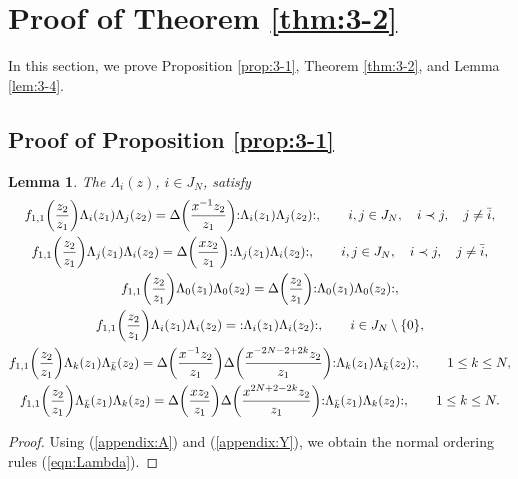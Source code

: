\documentclass[10pt,a4paper]{amsart}
\numberwithin{equation}{section}
\newtheorem{Lemma}[Theorem]{Lemma}
\begin{document}
\section{Proof of Theorem \ref{thm:3-2}}
\label{section:4}

In this section, we prove
Proposition \ref{prop:3-1},
Theorem \ref{thm:3-2},
and Lemma \ref{lem:3-4}.

\subsection{Proof of Proposition \ref{prop:3-1}}

\begin{Lemma}
The $\Lambda_i(z)$, $i \in J_N$, satisfy
\begin{gather}
f_{1,1}\biggl(\frac{z_2}{z_1}\biggr)\Lambda_i(z_1)\Lambda_j(z_2)=
\Delta\biggl(\frac{x^{-1}z_2}{z_1}\biggr)
{:}\Lambda_i(z_1)\Lambda_j(z_2){:},\qquad
i,j \in J_N,\quad i \prec j,\quad j \neq \bar{i},\notag
\\
f_{1,1}\biggl(\frac{z_2}{z_1}\biggr)\Lambda_j(z_1)\Lambda_i(z_2)=
\Delta\biggl(\frac{x z_2}{z_1}\biggr){:}\Lambda_j(z_1)\Lambda_i(z_2){:},\qquad
{i,j \in J_N,\quad i \prec j,\quad j \neq \bar{i}},\notag
\\
f_{1,1}\biggl(\frac{z_2}{z_1}\biggr)\Lambda_0(z_1)\Lambda_0(z_2)=
\Delta\biggl(\frac{z_2}{z_1}\biggr){:}\Lambda_0(z_1)\Lambda_0(z_2){:},\notag
\\
f_{1,1}\biggl(\frac{z_2}{z_1}\biggr)\Lambda_i(z_1)\Lambda_i(z_2)=
{:}\Lambda_i(z_1)\Lambda_i(z_2){:},\qquad
i \in J_N\setminus \{0\},
\label{eqn:Lambda}
\\
f_{1,1}\biggl(\frac{z_2}{z_1}\biggr)\Lambda_k(z_1)\Lambda_{\bar{k}}(z_2)=
\Delta\biggl(\frac{x^{-1}z_2}{z_1}\biggr)
\Delta\biggl(\frac{x^{-2N-2+2k}z_2}{z_1}\biggr)
{:}\Lambda_k(z_1)\Lambda_{\bar{k}}(z_2){:},\qquad
1\leq k \leq N,
\notag
\\
f_{1,1}\biggl(\frac{z_2}{z_1}\biggr)\Lambda_{\bar{k}}(z_1)\Lambda_{k}(z_2)=
\Delta\biggl(\frac{xz_2}{z_1}\biggr)
\Delta\biggl(\frac{x^{2N+2-2k}z_2}{z_1}\biggr)
{:}\Lambda_{\bar{k}}(z_1)\Lambda_{k}(z_2){:},\qquad
1\leq k \leq N.
\notag
\end{gather}
\end{Lemma}

\begin{proof}
Using (\ref{appendix:A}) and (\ref{appendix:Y}),
we obtain the normal ordering rules (\ref{eqn:Lambda}).
\end{proof}
\end{document}

